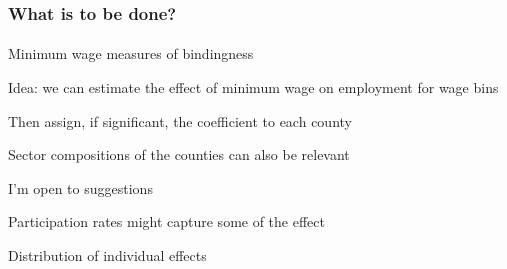 \begin{frame}

    \frametitle{What is to be done?} %
    \framesubtitle{}  %
    \rmfamily %
    
    \begin{wideitemize}
        \item Minimum wage measures of bindingness
        \vspace{9pt}
        \begin{wideitemize}
            \item Idea: we can estimate the effect of minimum wage on employment for wage bins
            \item Then assign, if significant, the coefficient to each county
            \item Sector compositions of the counties can also be relevant
        \end{wideitemize}
        \item I'm \textcolor{fblu}{open to suggestions}
        \item Participation rates might capture some of the effect
        \item Distribution of individual effects
    \end{wideitemize}
    
\end{frame}


